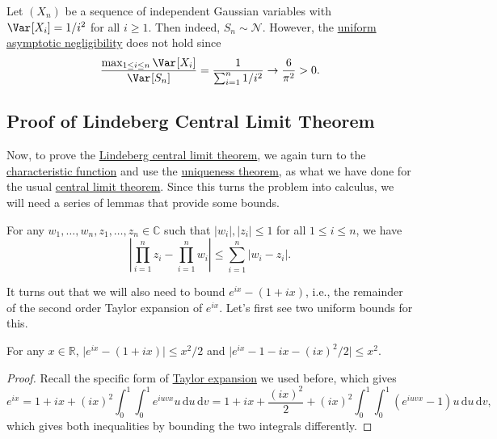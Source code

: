 \begin{remark}
	Let \((X_n)\) be a sequence of independent Gaussian variables with \(\Var_{}[X_i] = 1 / i^2\) for all \(i \geq 1\). Then indeed, \(S_n \sim \mathcal{N} \). However, the \hyperref[def:uniform-asymptotic-negligibility]{uniform asymptotic negligibility} does not hold since
	\[
		\frac{\max _{1 \leq i \leq n} \Var_{}[X_i]}{\Var_{}[S_n]} = \frac{1}{\sum_{i=1}^{n} 1 / i^2} \to \frac{6}{\pi ^2} > 0 .
	\]
\end{remark}

\subsection{Proof of Lindeberg Central Limit Theorem}
Now, to prove the \hyperref[thm:Lindeberg-CLT]{Lindeberg central limit theorem}, we again turn to the \hyperref[def:characteristic-function]{characteristic function} and use the \hyperref[thm:characteristic-function-uniqueness]{uniqueness theorem}, as what we have done for the usual \hyperref[thm:CLT]{central limit theorem}. Since this turns the problem into calculus, we will need a series of lemmas that provide some bounds.

\begin{lemma}\label{lma:Lindeberg-CLT-1}
	For any \(w_1, \dots , w_n, z_1, \dots , z_n \in \mathbb{C} \) such that \(\vert w_i \vert , \vert z_i \vert \leq 1\) for all \(1 \leq i \leq n\), we have
	\[
		\left\vert \prod_{i=1}^{n} z_i - \prod_{i=1}^{n} w_i \right\vert
		\leq \sum_{i=1}^{n} \vert w_i - z_i \vert .
	\]
\end{lemma}

It turns out that we will also need to bound \(e^{ix} - (1 + ix)\), i.e., the remainder of the second order Taylor expansion of \(e^{ix}\). Let's first see two uniform bounds for this.

\begin{lemma}\label{lma:Lindeberg-CLT-2}
	For any \(x \in \mathbb{R} \), \(\vert e^{ix} - (1 + ix) \vert \leq x^2 / 2\) and \(\vert e^{ix} - 1 - ix - (ix)^2 / 2 \vert \leq x^2\).
\end{lemma}
\begin{proof}
	Recall the specific form of \hyperref[note:lec10]{Taylor expansion} we used before, which gives
	\[
		e^{ix}
		= 1 + ix + (ix)^2 \int_{0}^{1} \int_{0}^{1} e^{i u v x} u \,\mathrm{d}u  \,\mathrm{d}v
		= 1 + ix + \frac{(ix)^2}{2} + (ix)^2 \int_{0}^{1} \int_{0}^{1} (e^{i u v x} - 1) u \,\mathrm{d}u  \,\mathrm{d}v,
	\]
	which gives both inequalities by bounding the two integrals differently.
\end{proof}

